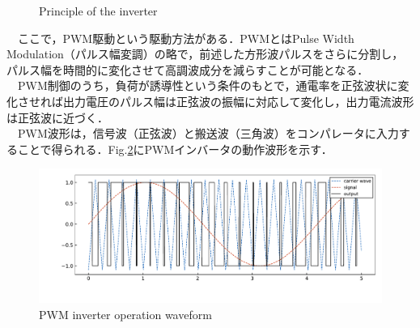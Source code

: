 \begin{figure}[H]
    \begin{center}
    \hspace{5truemm}
    \end{center}
    \caption{Principle of the inverter}
    \label{fig:principle_of_the_inverter}
\end{figure}

　ここで，PWM駆動という駆動方法がある．PWMとはPulse Width Modulation（パルス幅変調）の略で，前述した方形波パルスをさらに分割し，パルス幅を時間的に変化させて高調波成分を減らすことが可能となる．\\
　PWM制御のうち，負荷が誘導性という条件のもとで，通電率を正弦波状に変化させれば出力電圧のパルス幅は正弦波の振幅に対応して変化し，出力電流波形は正弦波に近づく．\\
　PWM波形は，信号波（正弦波）と搬送波（三角波）をコンパレータに入力することで得られる．Fig.\ref{fig:PWM_graph}にPWMインバータの動作波形を示す．
\begin{figure}[H]
    \centering
    \includegraphics[width=15cm]{./fig/PWM_graph.pdf}
    \caption{PWM inverter operation waveform}
    \label{fig:PWM_graph}
\end{figure}


